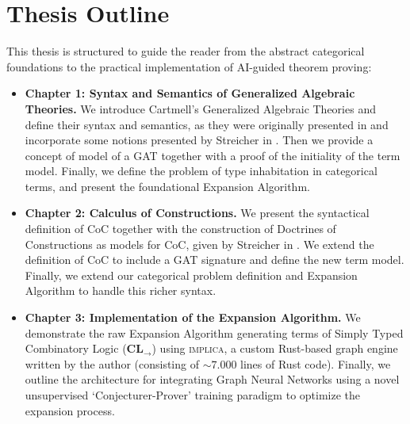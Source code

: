 \section*{Thesis Outline}
This thesis is structured to guide the reader from the abstract categorical foundations
to the practical implementation of AI-guided theorem proving:
\begin{itemize}
    \item \textbf{Chapter 1: Syntax and Semantics of Generalized Algebraic Theories.}
        We introduce Cartmell's Generalized Algebraic Theories and define their syntax and semantics, as 
        they were originally presented in \cite{cartmell1978, cartmell1986} and incorporate some notions
        presented by Streicher in \cite{streicher}.
        Then we provide a concept of model of a GAT together with a proof of the initiality of the term model.
        Finally, we define the problem of type inhabitation in categorical terms, and present the foundational Expansion Algorithm.
    \item \textbf{Chapter 2: Calculus of Constructions.} 
        We present the syntactical definition of CoC together with the construction 
        of Doctrines of Constructions as models for CoC, given by Streicher in \cite{streicher}.
        We extend the definition of CoC to include a GAT signature and define the new term model.
        Finally, we extend our categorical problem definition and 
        Expansion Algorithm to handle this richer syntax.
    \item \textbf{Chapter 3: Implementation of the Expansion Algorithm.} 
        We demonstrate the raw Expansion Algorithm generating terms of Simply Typed Combinatory 
        Logic ($\textbf{CL}_\to$) using \textsc{implica}, a custom Rust-based graph engine written by the author (consisting of $\sim 7.000$ lines of Rust code). 
        Finally, we outline the architecture for integrating Graph Neural Networks
        using a novel unsupervised `Conjecturer-Prover' training paradigm to optimize the expansion process.
\end{itemize}

